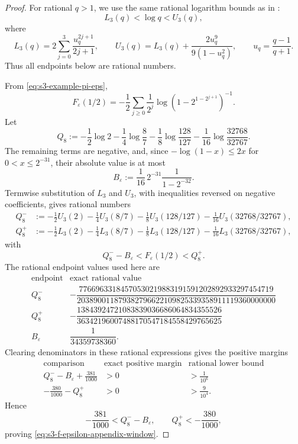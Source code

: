 \documentclass[11pt,a4paper]{amsart}
\theoremstyle{plain}
\theoremstyle{definition}
\theoremstyle{remark}
\begin{document}
\begin{proof}
  For rational \(q>1\), we use the same rational logarithm bounds as in
  :
  \[
    L_3(q)<\log q<U_3(q),
  \]
  where
  \[
    L_3(q)=2\sum_{j=0}^{3}\frac{u_q^{2j+1}}{2j+1},
    \qquad
    U_3(q)=L_3(q)+\frac{2u_q^9}{9(1-u_q^2)},
    \qquad
    u_q=\frac{q-1}{q+1}.
  \]
  Thus all endpoints below are rational numbers.

  From \eqref{eq:s3-example-pi-eps},
  \[
    F_\varepsilon(1/2)
    =-\frac12\sum_{j\ge0}\frac{1}{2^j}
      \log\left(1-2^{1-2^{j+1}}\right)^{-1}.
  \]
  Let
  \[
    Q_8:=-\frac12\log2-\frac14\log\frac87
      -\frac18\log\frac{128}{127}
      -\frac1{16}\log\frac{32768}{32767}.
  \]
  The remaining terms are negative, and, since
  \(-\log(1-x)\le2x\) for \(0<x\le2^{-31}\), their absolute value is at
  most
  \[
    B_\varepsilon:=\frac{1}{16}\,2^{-31}\frac{1}{1-2^{-32}}.
  \]
  Termwise substitution of \(L_3\) and \(U_3\), with inequalities reversed
  on negative coefficients, gives rational numbers
  \[
  \begin{aligned}
    Q_8^- &:=-\frac12U_3(2)-\frac14U_3(8/7)
      -\frac18U_3(128/127)-\frac1{16}U_3(32768/32767),\\
    Q_8^+ &:=-\frac12L_3(2)-\frac14L_3(8/7)
      -\frac18L_3(128/127)-\frac1{16}L_3(32768/32767),
  \end{aligned}
  \]
  with
  \[
    Q_8^- - B_\varepsilon < F_\varepsilon(1/2)<Q_8^+.
  \]
  The rational endpoint values used here are
  \[
  \begin{array}{c|c}
    \text{endpoint} & \text{exact rational value}\\
    \hline
    Q_8^- &
    -\dfrac{77669633184570530219883191591202892933297454719}
      {203890011879382796622109825339358911119360000000}\\[1ex]
    Q_8^+ &
    -\dfrac{13843924721083839036686064834355526}
      {36342196007488170547184558429765625}\\[1ex]
    B_\varepsilon & \dfrac{1}{34359738360}.
  \end{array}
  \]
  Clearing denominators in these rational expressions gives the positive
  margins
  \[
  \begin{array}{c|c|c}
    \text{comparison} & \text{exact positive margin} &
      \text{rational lower bound}\\
    \hline
    Q_8^- -B_\varepsilon +\frac{381}{1000} & >0 & >\frac{1}{10^6}\\
    -\frac{380}{1000}-Q_8^+ & >0 & >\frac{9}{10^4}.
  \end{array}
  \]
  Hence
  \[
    -\frac{381}{1000}<Q_8^- - B_\varepsilon,
    \qquad
    Q_8^+<-\frac{380}{1000},
  \]
  proving \eqref{eq:s3-f-epsilon-appendix-window}.


\end{proof}
\end{document}
